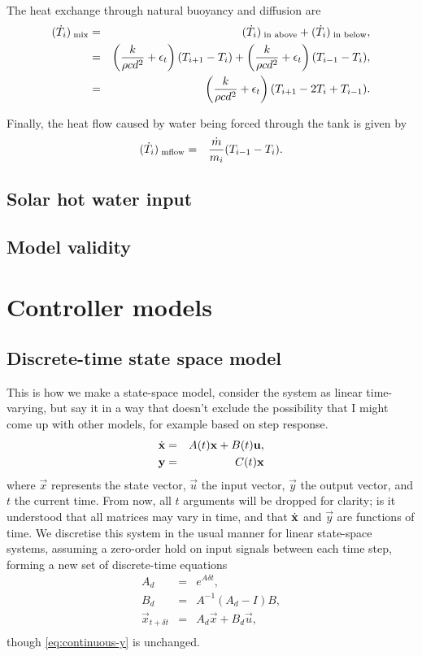 The heat exchange through natural buoyancy and diffusion are
\begin{eqnarray}
	\label{eq:flow-mix}
	(\dot{T}_i)_{\;\text{mix}} &=& (\dot{T}_i)_{\;\text{in above}} + (\dot{T}_i)_{\;\text{in below}}, \nonumber\\
	           &=& \left(\frac{k}{\rho c d^2} + \epsilon_t\right)(T_{i+1} - T_i)
				    + \left(\frac{k}{\rho c d^2} + \epsilon_t\right)(T_{i-1} - T_i), \nonumber\\
				  &=& \left(\frac{k}{\rho c d^2} + \epsilon_t\right)(T_{i+1} - 2 T_i + T_{i-1}).
\end{eqnarray}

Finally, the heat flow caused by water being forced through the tank is given by
\begin{eqnarray}
	\label{eq:flow-mflow}
	(\dot{T}_i)_{\;\text{mflow}} &=& \frac{\dot{m}}{m_i} (T_{i-1} - T_i).
\end{eqnarray}

\subsection{Solar hot water input}

\subsection{Model validity}

\section{Controller models}

\subsection{Discrete-time state space model}

This is how we make a state-space model, consider the system as linear time-varying, but say it in a way that doesn't exclude the possibility that I might come up with other models, for example based on step response.
\begin{eqnarray}
	\label{eq:continuous-xdot}
	\dot{\mathbf{x}} &=& A(t) \mathbf{x} + B(t) \mathbf{u}, \\
	\label{eq:continuous-y}
	\mathbf{y} &=& C(t) \mathbf{x}
\end{eqnarray}
where $\vec{x}$ represents the state vector, $\vec{u}$ the input vector, $\vec{y}$ the output vector, and $t$ the current time.
From now, all $t$ arguments will be dropped for clarity; is it understood that all matrices may vary in time, and that $\dot{\mathbf{x}}$ and $\vec{y}$ are functions of time.
We discretise this system in the usual manner for linear state-space systems, assuming a zero-order hold on input signals between each time step, forming a new set of discrete-time equations
\begin{eqnarray}
	\label{eq:discretise-A}
	A_d &=& e^{A \delta t}, \\
	\label{eq:discretise-B}
	B_d &=& A^{-1} (A_d - I) B, \\
	\label{eq:discrete-xdot}
	\vec{x}_{t + \delta t} &=& A_d \vec{x} + B_d \vec{u}, \\
\end{eqnarray}
though \autoref{eq:continuous-y} is unchanged.

